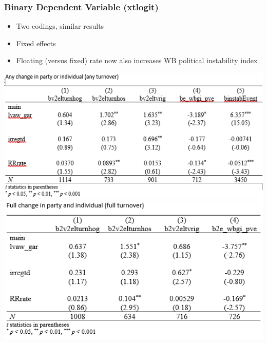 \documentclass[]{beamer}
\begin{document}
\begin{frame}
\frametitle{Binary Dependent Variable (xtlogit)}
    \begin{itemize}
        \item Two codings, similar results
        \item Fixed effects
        \item Floating (versus fixed) rate now also increases WB political instability index
    \end{itemize}
    \includegraphics{img0010.png}
    \includegraphics{img0011.png}
\end{frame}
\end{document}
